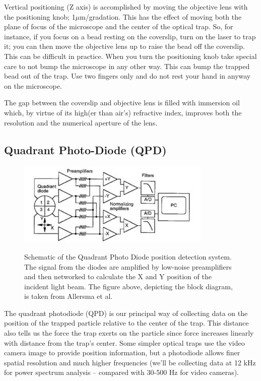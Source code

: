 \documentclass{../lab}
\begin{document}
Vertical positioning (Z axis) is accomplished by moving the objective lens with the positioning knob; 1$\mu$m/gradation. This has the effect of moving both the plane of focus of the microscope and the center of the optical trap. So, for instance, if you focus on a bead resting on the coverslip, turn on the laser to trap it; you can then move the objective lens up to raise the bead off the coverslip. This can be difficult in practice. When you turn the positioning knob take special care to not bump the microscope in any other way. This can bump the trapped bead out of the trap. Use two fingers only and do not rest your hand in anyway on the microscope.

The gap between the coverslip and objective lens is filled with immersion oil which, by virtue of its high(er than air's) refractive index, improves both the resolution and the numerical aperture of the lens.

\subsection{Quadrant Photo-Diode (QPD)}

\begin{figure}[h]
    \centering
    \href{http://experimentationlab.berkeley.edu/sites/default/files/images/350px-QPD2.jpg}{\includegraphics[width=0.5\linewidth]{images/350px-QPD2.jpg}}
    \caption{Schematic of the Quadrant Photo Diode position detection system. The signal from the diodes are amplified by low-noise preamplifiers and then networked to calculate the X and Y position of the incident light beam. The figure above, depicting the block diagram, is taken from  Allersma et al.}
    \label{fig:350px-QPD2}
\end{figure}

The quadrant photodiode (QPD) is our principal way of collecting data on the position of the trapped particle relative to the center of the trap. This distance also tells us the force the trap exerts on the particle since force increases linearly with distance from the trap's center. Some simpler optical traps use the video camera image to provide position information, but a photodiode allows finer spatial resolution and much higher frequencies (we'll be collecting data at 12 kHz for power spectrum analysis -- compared with 30-500 Hz for video cameras).
\end{document}
